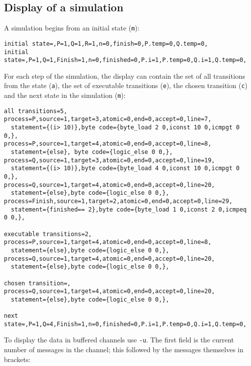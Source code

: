 \documentclass[11pt]{article}
\newcommand*{\p}[1]{\texttt{#1}}
\begin{document}
\subsection{Display of a simulation}
A simulation begins from an initial state (\p{m}):

\begin{footnotesize}
\begin{verbatim}
initial state=,P=1,Q=1,R=1,n=0,finish=0,P.temp=0,Q.temp=0,
initial state=,P=1,Q=1,Finish=1,n=0,finished=0,P.i=1,P.temp=0,Q.i=1,Q.temp=0,
\end{verbatim}
\end{footnotesize}

For each step of the simulation, the display can contain the set of all
transitions from the state (\p{a}), the set of executable transitions
(\p{e}), the chosen transition (\p{c}) and the next state in the
simulation (\p{m}):

\begin{footnotesize}
\begin{verbatim}
all transitions=5,
process=P,source=1,target=3,atomic=0,end=0,accept=0,line=7,
  statement={(i> 10)},byte code={byte_load 2 0,iconst 10 0,icmpgt 0 0,},
process=P,source=1,target=4,atomic=0,end=0,accept=0,line=8,
  statement={else}, byte code={logic_else 0 0,},
process=Q,source=1,target=3,atomic=0,end=0,accept=0,line=19,
  statement={(i> 10)},byte code={byte_load 4 0,iconst 10 0,icmpgt 0 0,},
process=Q,source=1,target=4,atomic=0,end=0,accept=0,line=20,
  statement={else},byte code={logic_else 0 0,},
process=Finish,source=1,target=2,atomic=0,end=0,accept=0,line=29,
  statement={finished== 2},byte code={byte_load 1 0,iconst 2 0,icmpeq 0 0,},

executable transitions=2,
process=P,source=1,target=4,atomic=0,end=0,accept=0,line=8,
  statement={else},byte code={logic_else 0 0,},
process=Q,source=1,target=4,atomic=0,end=0,accept=0,line=20,
  statement={else},byte code={logic_else 0 0,},

chosen transition=,
process=Q,source=1,target=4,atomic=0,end=0,accept=0,line=20,
  statement={else},byte code={logic_else 0 0,},

next state=,P=1,Q=4,Finish=1,n=0,finished=0,P.i=1,P.temp=0,Q.i=1,Q.temp=0,
\end{verbatim}
\end{footnotesize}

To display the data in buffered channels use \p{-u}.
The first field is the current number of messages in the channel;
this followed by the messages themselves in brackets:
\end{document}
